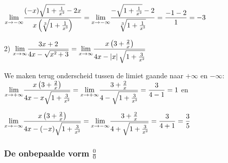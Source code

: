 \begin{itemize}
${\displaystyle {\displaystyle \lim_{x\to-\infty}}\frac{(-x)\sqrt{1+\frac{1}{x\text{\texttwosuperior}}}-2x}{x\left(\sqrt[3]{1+\frac{1}{x\text{\textthreesuperior}}}\right)}={\displaystyle \lim_{x\to-\infty}}\frac{-\sqrt{1+\frac{1}{x\text{\texttwosuperior}}}-2}{\sqrt[3]{1+\frac{1}{x\text{\textthreesuperior}}}}=\frac{-1-2}{1}=-3}$ 



2) ${\displaystyle {\displaystyle \lim_{x\to\infty}}\frac{3x+2}{4x-\sqrt{x\text{\texttwosuperior}+3}}={\displaystyle \lim_{x\to\infty}}\frac{x\left(3+\frac{2}{x}\right)}{4x-\left|x\right|\sqrt{1+\frac{3}{x\text{\texttwosuperior}}}}}$

We maken terug onderscheid tussen de limiet gaande naar $+\infty$
en $-\infty$:
${\displaystyle \lim_{x\to+\infty}}{\displaystyle \frac{x\left(3+\frac{2}{x}\right)}{4x-x\sqrt{1+\frac{3}{x\text{\texttwosuperior}}}}={\displaystyle \lim_{x\to+\infty}}{\displaystyle \frac{3+\frac{2}{x}}{4-\sqrt{1+\frac{3}{x\text{\texttwosuperior}}}}=\frac{3}{4-1}=1}}$ en

${\displaystyle \lim_{x\to-\infty}}{\displaystyle \frac{x\left(3+\frac{2}{x}\right)}{4x-(-x)\sqrt{1+\frac{3}{x\text{\texttwosuperior}}}}={\displaystyle \lim_{x\to-\infty}}{\displaystyle \frac{3+\frac{2}{x}}{4+\sqrt{1+\frac{3}{x\text{\texttwosuperior}}}}=\frac{3}{4+1}=\frac{3}{5}}}$
\end{itemize}

\subsubsection{De onbepaalde vorm $\frac{0}{0}$}


